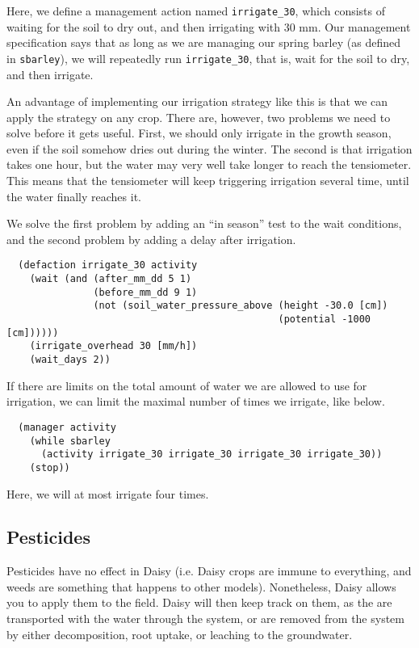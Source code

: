 \documentclass[a4paper]{article}
\begin{document}
Here, we define a management action named \texttt{irrigate\_30}, which
consists of waiting for the soil to dry out, and then irrigating
with 30 mm.  Our management specification says that as long as we are
managing our spring barley (as defined in \texttt{sbarley}), we will
repeatedly run \texttt{irrigate\_30}, that is, wait for the soil to
dry, and then irrigate.

An advantage of implementing our irrigation strategy like this is
that we can apply the strategy on any crop.  There are, however, two
problems we need to solve before it gets useful.  First, we should only
irrigate in the growth season, even if the soil somehow dries out
during the winter.  The second is that irrigation takes one hour, but
the water may very well take longer to reach the tensiometer.  This
means that the tensiometer will keep triggering irrigation several
time, until the water finally reaches it.

We solve the first problem by adding an ``in season'' test to the wait
conditions, and the second problem by adding a delay after
irrigation. 
\begin{verbatim}
  (defaction irrigate_30 activity 
    (wait (and (after_mm_dd 5 1)
               (before_mm_dd 9 1)
               (not (soil_water_pressure_above (height -30.0 [cm])
                                               (potential -1000 [cm])))))
    (irrigate_overhead 30 [mm/h])
    (wait_days 2))
\end{verbatim}

If there are limits on the total amount of water we are allowed to use
for irrigation, we can limit the maximal number of times we irrigate,
like below.
\begin{verbatim}
  (manager activity
    (while sbarley
      (activity irrigate_30 irrigate_30 irrigate_30 irrigate_30))
    (stop))
\end{verbatim}
Here, we will at most irrigate four times.

\subsection{Pesticides}
\label{sec:pesticides}

Pesticides have no effect in Daisy (i.e. Daisy crops are immune
to everything, and weeds are something that happens to other models).
Nonetheless, Daisy allows you to apply them to the field.  Daisy
will then keep track on them, as the are transported with the water
through the system, or are removed from the system by either
decomposition, root uptake, or leaching to the groundwater.
\end{document}
